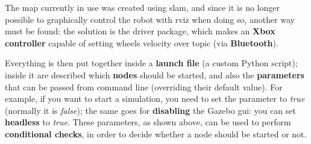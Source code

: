 The map currently in use was created using \acrshort{slam}, and since it is no longer possible to graphically control the robot with \acrshort{rviz} when doing so, another way must be found: the solution is the  driver package, which makes an \textbf{Xbox controller} capable of setting wheels velocity over  topic (via \textbf{Bluetooth}).

Everything is then put together inside a \textbf{launch file} (a custom Python script); inside it are described which \textbf{nodes} should be started, and also the \textbf{parameters} that can be passed from command line (overriding their default value). For example, if you want to start a simulation, you need to set the  parameter to \textit{true} (normally it is \textit{false}); the same goes for \textbf{disabling} the Gazebo \acrfull{gui}: you can set \textbf{headless} to \textit{true}. These parameters, as shown above, can be used to perform \textbf{conditional checks}, in order to decide whether a node should be started or not.